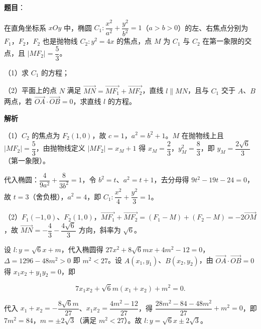 \begin{answer}

\textbf{题目}：

在直角坐标系 $xOy$ 中，椭圆 $C_1:\dfrac{x^2}{a^2}+\dfrac{y^2}{b^2}=1$（$a>b>0$）的左、右焦点分别为 $F_1$，$F_2$，$F_2$ 也是抛物线 $C_2:y^2=4x$ 的焦点，点 $M$ 为 $C_1$ 与 $C_2$ 在第一象限的交点，且 $|MF_2|=\dfrac53$。

（1）求 $C_1$ 的方程；

（2）平面上的点 $N$ 满足 $\overrightarrow{MN}=\overrightarrow{MF_1}+\overrightarrow{MF_2}$，直线 $l\parallel MN$，且与 $C_1$ 交于 $A$、$B$ 两点，若 $\overrightarrow{OA}\cdot\overrightarrow{OB}=0$，求直线 $l$ 的方程。

\textbf{解析}

（1）$C_2$ 的焦点为 $F_2(1,0)$，故 $c=1$，$a^2=b^2+1$。$M$ 在抛物线上且 $|MF_2|=\dfrac53$，由抛物线定义 $|MF_2|=x_M+1$ 得 $x_M=\dfrac23$，$y_M^2=\dfrac83$，即 $y_M=\dfrac{2\sqrt6}3$（第一象限）。

代入椭圆：$\dfrac{4}{9a^2}+\dfrac{8}{3b^2}=1$，令 $b^2=t$、$a^2=t+1$，去分母得 $9t^2-19t-24=0$，故 $t=3$（舍负根），$a^2=4$，即 $C_1:\dfrac{x^2}4+\dfrac{y^2}3=1$。

（2）$F_1(-1,0)$、$F_2(1,0)$，$\overrightarrow{MF_1}+\overrightarrow{MF_2}=(F_1-M)+(F_2-M)=-2\overrightarrow{OM}$，故 $\overrightarrow{MN}=-\dfrac43-\dfrac{4\sqrt6}3$ 方向，斜率为 $\sqrt6$。

设 $l:y=\sqrt6x+m$，代入椭圆得 $27x^2+8\sqrt6mx+4m^2-12=0$，$\Delta=1296-48m^2>0$ 即 $m^2<27$。设 $A(x_1,y_1)$、$B(x_2,y_2)$，由 $\overrightarrow{OA}\cdot\overrightarrow{OB}=0$ 得 $x_1x_2+y_1y_2=0$，即

\nopagebreak[4]
\[7x_1x_2+\sqrt6m(x_1+x_2)+m^2=0.\]

代入 $x_1+x_2=-\dfrac{8\sqrt6m}{27}$、$x_1x_2=\dfrac{4m^2-12}{27}$，得 $\dfrac{28m^2-84-48m^2}{27}+m^2=0$，即 $7m^2=84$，$m=\pm2\sqrt3$（满足 $m^2<27$）。故 $l:y=\sqrt6x\pm2\sqrt3$。


\end{answer}
